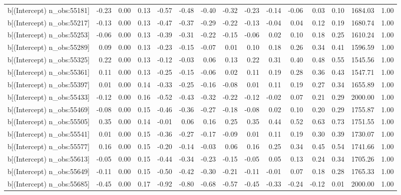 \begin{table}[ht]
\begin{tabular}{rrrrrrrrrrrrrrr}
  b[(Intercept) n\_obs:55181] & -0.23 & 0.00 & 0.13 & -0.57 & -0.48 & -0.40 & -0.32 & -0.23 & -0.14 & -0.06 & 0.03 & 0.10 & 1684.03 & 1.00 \\ 
  b[(Intercept) n\_obs:55217] & -0.13 & 0.00 & 0.13 & -0.47 & -0.37 & -0.29 & -0.22 & -0.13 & -0.04 & 0.04 & 0.12 & 0.19 & 1680.74 & 1.00 \\ 
  b[(Intercept) n\_obs:55253] & -0.06 & 0.00 & 0.13 & -0.39 & -0.31 & -0.22 & -0.15 & -0.06 & 0.02 & 0.10 & 0.18 & 0.25 & 1610.24 & 1.00 \\ 
  b[(Intercept) n\_obs:55289] & 0.09 & 0.00 & 0.13 & -0.23 & -0.15 & -0.07 & 0.01 & 0.10 & 0.18 & 0.26 & 0.34 & 0.41 & 1596.59 & 1.00 \\ 
  b[(Intercept) n\_obs:55325] & 0.22 & 0.00 & 0.13 & -0.12 & -0.03 & 0.06 & 0.13 & 0.22 & 0.31 & 0.40 & 0.48 & 0.55 & 1545.56 & 1.00 \\ 
  b[(Intercept) n\_obs:55361] & 0.11 & 0.00 & 0.13 & -0.25 & -0.15 & -0.06 & 0.02 & 0.11 & 0.19 & 0.28 & 0.36 & 0.43 & 1547.71 & 1.00 \\ 
  b[(Intercept) n\_obs:55397] & 0.01 & 0.00 & 0.14 & -0.33 & -0.25 & -0.16 & -0.08 & 0.01 & 0.11 & 0.19 & 0.27 & 0.34 & 1655.89 & 1.00 \\ 
  b[(Intercept) n\_obs:55433] & -0.12 & 0.00 & 0.16 & -0.52 & -0.43 & -0.32 & -0.22 & -0.12 & -0.02 & 0.07 & 0.21 & 0.29 & 2000.00 & 1.00 \\ 
  b[(Intercept) n\_obs:55469] & -0.08 & 0.00 & 0.15 & -0.46 & -0.36 & -0.27 & -0.18 & -0.08 & 0.02 & 0.10 & 0.20 & 0.29 & 1755.87 & 1.00 \\ 
  b[(Intercept) n\_obs:55505] & 0.35 & 0.00 & 0.14 & -0.01 & 0.06 & 0.16 & 0.25 & 0.35 & 0.44 & 0.52 & 0.63 & 0.73 & 1751.55 & 1.00 \\ 
  b[(Intercept) n\_obs:55541] & 0.01 & 0.00 & 0.15 & -0.36 & -0.27 & -0.17 & -0.09 & 0.01 & 0.11 & 0.19 & 0.30 & 0.39 & 1730.07 & 1.00 \\ 
  b[(Intercept) n\_obs:55577] & 0.16 & 0.00 & 0.15 & -0.20 & -0.14 & -0.03 & 0.06 & 0.16 & 0.25 & 0.34 & 0.45 & 0.54 & 1741.66 & 1.00 \\ 
  b[(Intercept) n\_obs:55613] & -0.05 & 0.00 & 0.15 & -0.44 & -0.34 & -0.23 & -0.15 & -0.05 & 0.05 & 0.13 & 0.24 & 0.34 & 1705.26 & 1.00 \\ 
  b[(Intercept) n\_obs:55649] & -0.11 & 0.00 & 0.15 & -0.50 & -0.42 & -0.30 & -0.21 & -0.11 & -0.01 & 0.07 & 0.18 & 0.28 & 1765.33 & 1.00 \\ 
  b[(Intercept) n\_obs:55685] & -0.45 & 0.00 & 0.17 & -0.92 & -0.80 & -0.68 & -0.57 & -0.45 & -0.33 & -0.24 & -0.12 & 0.01 & 2000.00 & 1.00 \\ 

\end{tabular}
\end{table}
